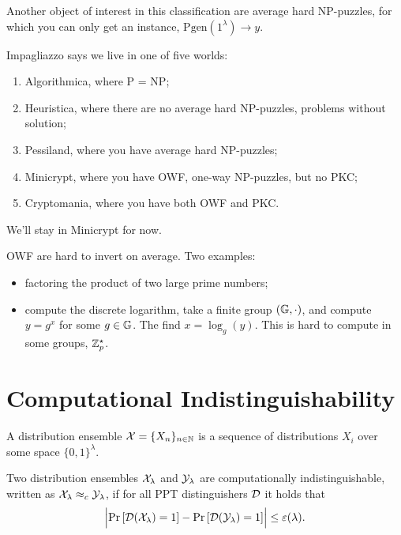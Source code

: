 Another object of interest in this classification are average hard NP-puzzles, for which you can only get an instance, \ie $\mathrm{Pgen}(1^{\lambda}) \to y$.

Impagliazzo says we live in one of five worlds:
\begin{enumerate}
	\item Algorithmica, where P = NP;
	\item Heuristica, where there are no average hard NP-puzzles, \ie problems without solution;
	\item Pessiland, where you have average hard NP-puzzles;
	\item Minicrypt, where you have \ac{OWF}, one-way NP-puzzles, but no \ac{PKC};
	\item Cryptomania, where you have both \ac{OWF} and \ac{PKC}.
\end{enumerate}
We'll stay in Minicrypt for now.

\ac{OWF} are hard to invert on average.
Two examples:
\begin{itemize}
	\item factoring the product of two large prime numbers;
	\item compute the discrete logarithm, \ie take a finite group $(\mathbb{G}, \cdot)$, and compute $y = g^x$ for some $g \in \mathbb{G}$.
	The find $x = \log_{g}(y)$.
	This is hard to compute in some groups, \eg $\mathbb{Z}^{\star}_{p}$.
\end{itemize}

\section{Computational Indistinguishability}

\begin{definition}
	A distribution ensemble $\mathcal{X} = \{ X_n \}_{n \in \mathbb{N}}$ is a sequence of distributions $X_i$ over some space $\{0,1\}^{\lambda}$.
\end{definition}

\begin{definition}
	Two distribution ensembles $\mathcal{X}_{\lambda}$ and $\mathcal{Y}_{\lambda}$ are computationally indistinguishable, written as $\mathcal{X}_{\lambda} \approx_c \mathcal{Y}_{\lambda}$, if for all \ac{PPT} distinguishers $\mathcal{D}$ it holds that
	\begin{equation*}
		\left|{\mathop{\mathrm{Pr}}\limits_{} \left[ {\mathcal{D}(\mathcal{X}_{\lambda}) = 1} \right] - \mathop{\mathrm{Pr}}\limits_{} \left[ {\mathcal{D}(\mathcal{Y}_{\lambda}) = 1} \right]}\right| \le \varepsilon(\lambda).
	\end{equation*}
\end{definition}

